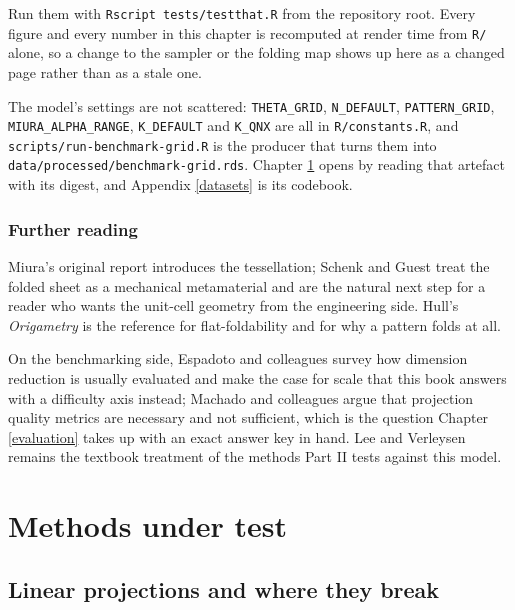 \documentclass[
  british,
  a4paper,
]{book}
\begin{document}
Run them with \texttt{Rscript\ tests/testthat.R} from the repository root. Every figure
and every number in this chapter is recomputed at render time from \texttt{R/} alone,
so a change to the sampler or the folding map shows up here as a changed page
rather than as a stale one.

The model's settings are not scattered: \texttt{THETA\_GRID}, \texttt{N\_DEFAULT},
\texttt{PATTERN\_GRID}, \texttt{MIURA\_ALPHA\_RANGE}, \texttt{K\_DEFAULT} and \texttt{K\_QNX} are all in
\texttt{R/constants.R}, and \texttt{scripts/run-benchmark-grid.R} is the producer that turns
them into \texttt{data/processed/benchmark-grid.rds}. Chapter \ref{linear} opens by
reading that artefact with its digest, and Appendix \ref{datasets} is its
codebook.

\section{Further reading}\label{gen-reading}

Miura's original report \citep{miura1985method} introduces the tessellation; Schenk
and Guest \citep{schenk2013geometry} treat the folded sheet as a mechanical
metamaterial and are the natural next step for a reader who wants the unit-cell
geometry from the engineering side. Hull's \emph{Origametry} \citep{hull2020origametry} is
the reference for flat-foldability and for why a pattern folds at all.

On the benchmarking side, Espadoto and colleagues \citep{espadoto2021survey} survey
how dimension reduction is usually evaluated and make the case for scale that
this book answers with a difficulty axis instead; Machado and colleagues
\citep{machado2025necessary} argue that projection quality metrics are necessary and
not sufficient, which is the question Chapter \ref{evaluation} takes up with an
exact answer key in hand. Lee and Verleysen \citep{lee2007nonlinear} remains the
textbook treatment of the methods Part II tests against this model.

\part{Methods under test}\label{part-methods-under-test}

\chapter{Linear projections and where they break}\label{linear}
\end{document}

